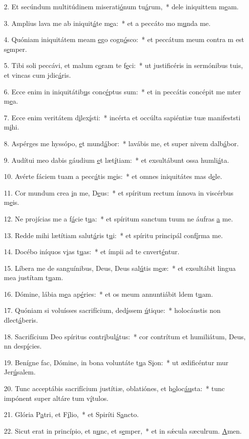 2. Et secúndum multitúdinem miserati\uline{ó}num tu\uline{á}rum,~* dele iniquittem m\uline{e}am.\par 
3. Amplius lava me ab iniquit\uline{á}te m\uline{e}a:~* et a peccáto mo m\uline{u}nda me.\par 
4. Quóniam iniquitátem meam \uline{e}go cogn\uline{ó}sco:~* et peccátum meum contra m est s\uline{e}mper.\par 
5. Tibi soli peccávi, et malum c\uline{o}ram te f\uline{e}ci:~* ut justificéris in sermónibus tuis, et vincas cum jdic\uline{á}ris.\par 
6. Ecce enim in iniquitátib\uline{u}s conc\uline{é}ptus sum:~* et in peccátis concépit me mter m\uline{e}a.\par 
7. Ecce enim veritátem d\uline{i}lex\uline{í}sti:~* incérta et occúlta sapiéntiæ tuæ manifeststi m\uline{i}hi.\par 
8. Aspérges me hyssópo, \uline{e}t mund\uline{á}bor:~* lavábis me, et super nivem dalb\uline{á}bor.\par 
9. Audítui meo dabis gáudium \uline{e}t læt\uline{í}tiam:~* et exsultábunt ossa humli\uline{á}ta.\par 
10. Avérte fáciem tuam a pecc\uline{á}tis m\uline{e}is:~* et omnes iniquitátes mas d\uline{e}le.\par 
11. Cor mundum crea \uline{i}n me, D\uline{e}us:~* et spíritum rectum ínnova in viscérbus m\uline{e}is.\par 
12. Ne projícias me a f\uline{á}cie t\uline{u}a:~* et spíritum sanctum tuum ne áufras \uline{a} me.\par 
13. Redde mihi lætítiam salut\uline{á}ris t\uline{u}i:~* et spíritu principál conf\uline{í}rma me.\par 
14. Docébo iníquos v\uline{i}as t\uline{u}as:~* et ímpii ad te cnvert\uline{é}ntur.\par 
15. Líbera me de sanguínibus, Deus, Deus sal\uline{ú}tis m\uline{e}æ:~* et exsultábit lingua mea justítam t\uline{u}am.\par 
16. Dómine, lábia m\uline{e}a ap\uline{é}ries:~* et os meum annuntiábit ldem t\uline{u}am.\par 
17. Quóniam si voluísses sacrifícium, ded\uline{í}ssem \uline{ú}tique:~* holocáustis non dlect\uline{á}beris.\par 
18. Sacrifícium Deo spíritus contr\uline{i}bul\uline{á}tus:~* cor contrítum et humiliátum, Deus, nn desp\uline{í}cies.\par 
19. Benígne fac, Dómine, in bona voluntáte t\uline{u}a S\uline{i}on:~* ut ædificéntur mur Jer\uline{ú}salem.\par 
20. Tunc acceptábis sacrifícium justítiæ, oblatiónes, et h\uline{o}loc\uline{áu}sta:~* tunc impónent super altáre tum v\uline{í}tulos.\par 
21. Glória P\uline{a}tri, et F\uline{í}lio,~* et Spiríti S\uline{a}ncto.\par 
22. Sicut erat in princípio, et n\uline{u}nc, et s\uline{e}mper,~* et in sǽcula sæculrum. \uline{A}men.\par 
